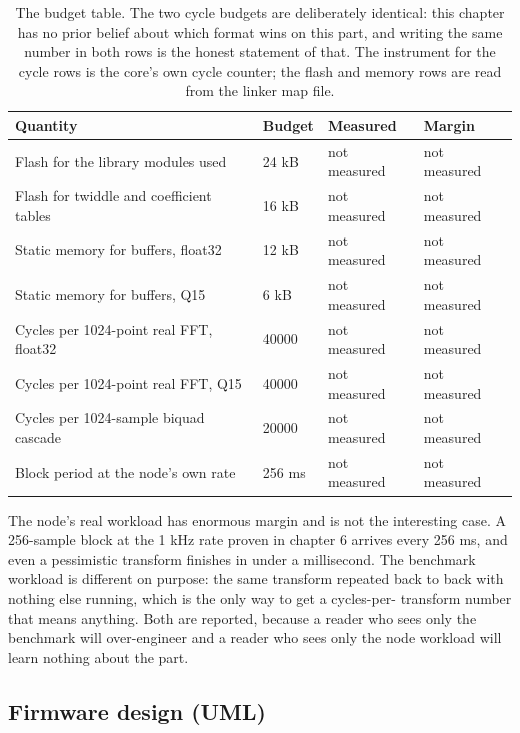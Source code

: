 \begin{table}[H]\centering\small
\begin{tabular}{p{44mm}p{28mm}p{28mm}p{30mm}}
\toprule
Quantity & Budget & Measured & Margin \\
\midrule
Flash for the library modules used & 24 kB & not measured & not measured \\
Flash for twiddle and coefficient tables & 16 kB & not measured & not measured \\
Static memory for buffers, float32 & 12 kB & not measured & not measured \\
Static memory for buffers, Q15 & 6 kB & not measured & not measured \\
Cycles per 1024-point real FFT, float32 & 40000 & not measured & not measured \\
Cycles per 1024-point real FFT, Q15 & 40000 & not measured & not measured \\
Cycles per 1024-sample biquad cascade & 20000 & not measured & not measured \\
Block period at the node's own rate & 256 ms & not measured & not measured \\
\bottomrule
\end{tabular}
\caption{The budget table. The two cycle budgets are deliberately identical: this chapter has no prior belief about which format wins on this part, and writing the same number in both rows is the honest statement of that. The instrument for the cycle rows is the core's own cycle counter; the flash and memory rows are read from the linker map file.}
\end{table}

The node's real workload has enormous margin and is not the interesting case. A
256-sample block at the 1 kHz rate proven in chapter 6 arrives every 256 ms,
and even a pessimistic transform finishes in under a millisecond. The
benchmark workload is different on purpose: the same transform repeated back to
back with nothing else running, which is the only way to get a cycles-per-
transform number that means anything. Both are reported, because a reader who
sees only the benchmark will over-engineer and a reader who sees only the node
workload will learn nothing about the part.

\subsection*{Firmware design (UML)}


